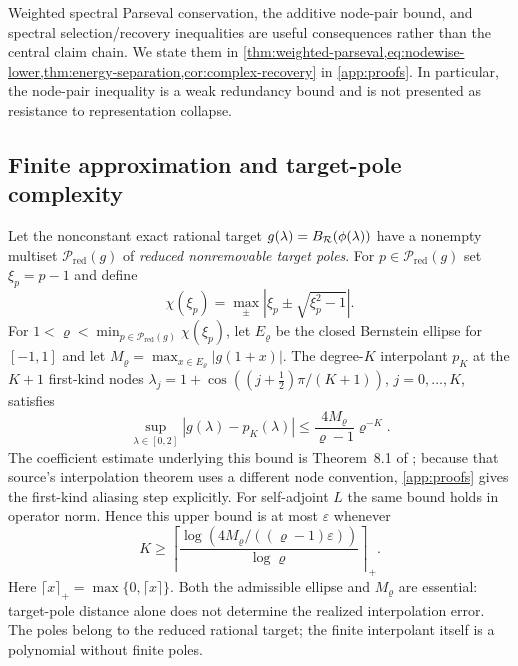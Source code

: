 Weighted spectral Parseval conservation, the additive node-pair bound, and
spectral selection/recovery inequalities are useful consequences rather than
the central claim chain.  We state them in
\cref{thm:weighted-parseval,eq:nodewise-lower,thm:energy-separation,cor:complex-recovery}
in \cref{app:proofs}.  In particular, the node-pair inequality is a weak
redundancy bound and is not presented as resistance to representation
collapse.

\subsection{Finite approximation and target-pole complexity}

\begin{theorem}
\label{thm:pole-distance-cheb}
Let the nonconstant exact rational target
$g(\lambda)=B_{\mathcal R}(\phi(\lambda))$ have a nonempty multiset
$\mathcal P_{\mathrm{red}}(g)$ of \emph{reduced nonremovable target poles}.
For $p\in\mathcal P_{\mathrm{red}}(g)$ set $\xi_p=p-1$ and define
\begin{equation}
 \chi(\xi_p)=\max_{\pm}|\xi_p\pm\sqrt{\xi_p^2-1}|.
\end{equation}
For $1<\varrho<\min_{p\in\mathcal P_{\mathrm{red}}(g)}\chi(\xi_p)$, let
$E_\varrho$ be the closed Bernstein ellipse for $[-1,1]$ and let
$M_\varrho=\max_{x\in E_\varrho}|g(1+x)|$.  The degree-$K$ interpolant $p_K$
at the $K+1$ first-kind nodes
$\lambda_j=1+\cos((j+\tfrac12)\pi/(K+1))$, $j=0,\ldots,K$, satisfies
\begin{equation}
 \sup_{\lambda\in[0,2]}|g(\lambda)-p_K(\lambda)|
 \leq \frac{4M_\varrho}{\varrho-1}\varrho^{-K}.
 \label{eq:cheb-bound}
\end{equation}
The coefficient estimate underlying this bound is Theorem~8.1 of
\citet{trefethen2019analytic}; because that source's
interpolation theorem uses a different node convention,
\cref{app:proofs} gives the first-kind aliasing step explicitly.
For self-adjoint $L$ the same bound holds in operator norm.  Hence this upper
bound is at most $\varepsilon$ whenever
\begin{equation}
 K\geq
 \left\lceil\frac{\log(4M_\varrho/((\varrho-1)\varepsilon))}
 {\log\varrho}\right\rceil_+.
 \label{eq:cheb-degree}
\end{equation}
Here $\lceil x\rceil_+=\max\{0,\lceil x\rceil\}$.
Both the admissible ellipse and $M_\varrho$ are essential: target-pole distance
alone does not determine the realized interpolation error.  The poles belong
to the reduced rational target; the finite interpolant itself is a polynomial
without finite poles.
\end{theorem}

